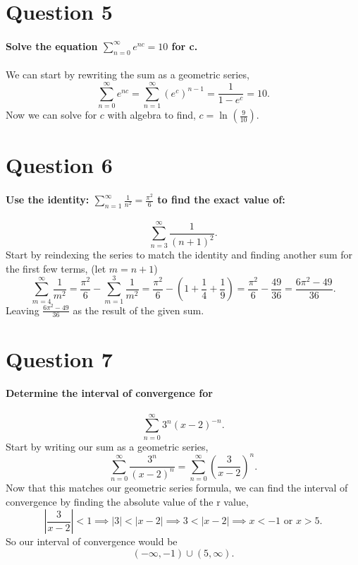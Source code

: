 \documentclass[a4paper]{article}
\begin{document}
\section*{Question 5}%
\paragraph{Solve the equation $ \sum_{ n=0 } ^{ \infty } e^{ nc } =10 $ for c. \\}
We can start by rewriting the sum as a geometric series,
\[
\sum_{ n=0 } ^{ \infty } e^{ nc } = \sum_{ n=1 } ^{ \infty } \left( e^{ c } \right)^{ n-1 } = \frac{ 1 }{ 1-e^{ c } } = 10 
.\] 
Now we can solve for $ c $ with algebra to find, $ c = \ln^{  } \left( \frac{ 9 }{ 10 }  \right)  $.
\newpage
\section*{Question 6}%
\label{sec:Question 6}
\paragraph{Use the identity: $ \sum_{ n=1 } ^{ \infty } \frac{ 1 }{ n^2 } =\frac{ \pi^2 }{ 6 } $ to find the exact value of:}
\[
\sum_{ n=3 } ^{ \infty } \frac{ 1 }{ \left( n+1 \right) ^2 } 
.\] 
Start by reindexing the series to match the identity and finding another sum for the first few terms, (let $ m=n+1 $)
\[
\sum_{ m=4 } ^{ \infty } \frac{ 1 }{ m^2 } = \frac{ \pi^2 }{ 6 }-\sum_{ m=1 } ^{ 3 } \frac{ 1 }{ m^2 } 
= \frac{ \pi^2 }{ 6 } - \left( 1+\frac{ 1 }{ 4 } +\frac{ 1 }{ 9 } \right) = \frac{ \pi^2 }{ 6 } - \frac{ 49 }{ 36 } = \frac{ 6 \pi^2-49 }{ 36 }
.\] 
Leaving $ \frac{ 6 \pi^2-49 }{ 36 } $ as the result of the given sum.
\section*{Question 7}%
\label{sec:Question 7}
\paragraph{Determine the interval of convergence for }
\[
\sum_{ n=0 } ^{ \infty } 3^{ n }\left( x-2 \right) ^{ -n }
.\] 
Start by writing our sum as a geometric series,
\[
\sum_{ n=0 } ^{ \infty } \frac{ 3^{ n } }{ \left( x-2 \right) ^{ n } }=\sum_{ n=0 } ^{ \infty } \left( \frac{ 3 }{ x-2 } \right) ^{ n }
.\] 
Now that this matches our geometric series formula, we can find the interval of convergence by finding the absolute value of the r value,
\[
\left| \frac{ 3 }{ x-2 }  \right| < 1 \implies \left| 3 \right| < \left| x-2 \right| \implies 3 < \left| x-2 \right| \implies x < -1 \text{ or }x > 5
.\] 
So our interval of convergence would be
\[
	\left( -\infty,-1 \right) \cup \left( 5,\infty \right) 
.\] 
\end{document}
